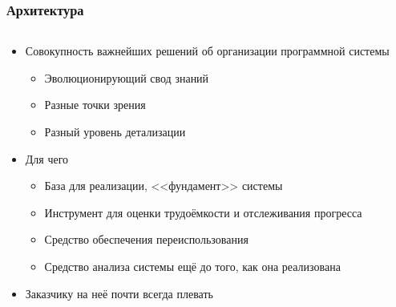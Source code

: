 \documentclass[xetex,mathserif,serif]{beamer}
\begin{document}
	\begin{frame}
		\frametitle{Архитектура}
		\begin{columns}
			\begin{column}{0.7\textwidth}
				\begin{itemize}
					\item Совокупность важнейших решений об организации программной системы
					\begin{itemize}
						\item Эволюционирующий свод знаний
						\item Разные точки зрения
						\item Разный уровень детализации
					\end{itemize}
					\item Для чего
					\begin{itemize}
						\item База для реализации, <<фундамент>> системы
						\item Инструмент для оценки трудоёмкости и отслеживания прогресса
						\item Средство обеспечения переиспользования
						\item Средство анализа системы ещё до того, как она реализована
					\end{itemize}
					\item Заказчику на неё почти всегда плевать
				\end{itemize}
			\end{column}
			\begin{column}{0.3\textwidth}

\end{column}
\end{columns}
\end{frame}
\end{document}
